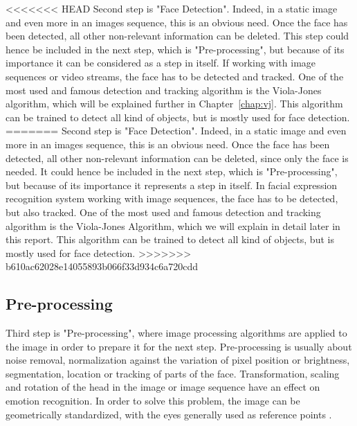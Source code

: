 \vspace{\baselineskip}
<<<<<<< HEAD
\noindent Second step is "Face Detection". Indeed, in a static image and even more in an images sequence, this is an obvious need. Once the face has been detected, all other non-relevant information can be deleted. This step could hence be included in the next step, which is "Pre-processing", but because of its importance it can be considered as a step in itself. If working with image sequences or video streams, the face has to be detected and tracked. One of the most used and famous detection and tracking algorithm is the Viola-Jones algorithm, which will be explained further in Chapter~\ref{chap:vj}. This algorithm can be trained to detect all kind of objects, but is mostly used for face detection.
=======
\noindent Second step is "Face Detection". Indeed, in a static image and even more in an images sequence, this is an obvious need. Once the face has been detected, all other non-relevant information can be deleted, since only the face is needed. It could hence be included in the next step, which is "Pre-processing", but because of its importance it represents a step in itself. In facial expression recognition system working with image sequences, the face has to be detected, but also tracked. One of the most used and famous detection and tracking algorithm is the Viola-Jones Algorithm, which we will explain in detail later in this report. This algorithm can be trained to detect all kind of objects, but is mostly used for face detection.
>>>>>>> b610ac62028e14055893b066f33d934c6a720cdd
\newline

\subsection{Pre-processing}

\vspace{\baselineskip}
\noindent Third step is "Pre-processing", where image processing algorithms are applied to the image in order to prepare it for the next step. Pre-processing is usually about noise removal, normalization against the variation of pixel position or brightness, segmentation, location or tracking of parts of the face. Transformation, scaling and rotation of the head in the image or image sequence have an effect on emotion recognition. In order to solve this problem, the image can be geometrically standardized, with the eyes generally used as reference points \cite{CHI03}.
\newline

